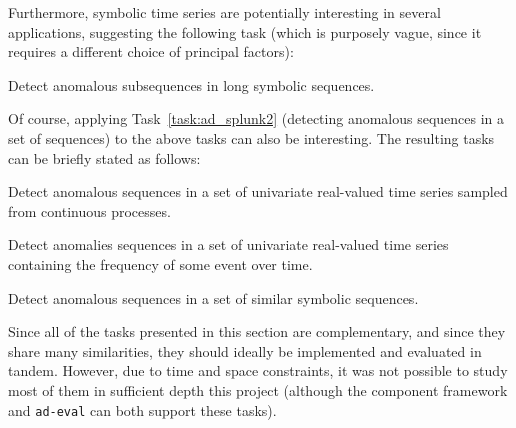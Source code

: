 Furthermore, symbolic time series are potentially interesting in several applications, suggesting the following task (which is purposely vague, since it requires a different choice of principal factors):

\begin{task}
  Detect anomalous subsequences in long symbolic sequences.
\end{task}

Of course, applying Task~\ref{task:ad_splunk2} (detecting anomalous sequences in a set of sequences) to the above tasks can also be interesting. The resulting tasks can be briefly stated as follows:

\begin{task}
  Detect anomalous sequences in a set of univariate real-valued time series sampled from continuous processes.
\end{task}

\begin{task}
  Detect anomalies sequences in a set of univariate real-valued time series containing the frequency of some event over time.
\end{task}

\begin{task}
  Detect anomalous sequences in a set of similar symbolic sequences.
\end{task}

Since all of the tasks presented in this section are complementary, and since they share many similarities, they should ideally be implemented and evaluated in tandem. However, due to time and space constraints, it was not possible to study most of them in sufficient depth this project (although the component framework and \texttt{ad-eval} can both support these tasks).
